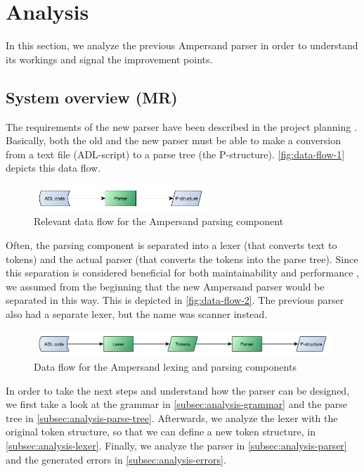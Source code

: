 
\section{Analysis}
\label{sec:analysis}
In this section, we analyze the previous Ampersand parser in order to understand its workings and signal the improvement points.

\subsection{System overview (MR)}
The requirements of the new parser have been described in the project planning .
Basically, both the old and the new parser must be able to make a conversion from a text file (ADL-script) to a parse tree (the P-structure).
\autoref{fig:data-flow-1} depicts this data flow.
%
\begin{figure}[htb!]
	\centering
	\includegraphics[width=0.586\textwidth]{Figures/DataFlow1}
	\caption{Relevant data flow for the Ampersand parsing component}
	\label{fig:data-flow-1}
\end{figure}

Often, the parsing component is separated into a lexer (that converts text to tokens) and the actual parser (that converts the tokens into the parse tree).
Since this separation is considered beneficial for both maintainability and performance , we assumed from the beginning that the new Ampersand parser would be separated in this way.
This is depicted in \autoref{fig:data-flow-2}.
The previous parser also had a separate lexer, but the name was scanner instead.
%
\begin{figure}[htb!]
	\centering
	\includegraphics[width=1\textwidth]{Figures/DataFlow2}
	\caption{Data flow for the Ampersand lexing and parsing components}
	\label{fig:data-flow-2}
\end{figure}

In order to take the next steps and understand how the parser can be designed, we first take a look at the grammar in \autoref{subsec:analysis-grammar} and the parse tree in \autoref{subsec:analysis-parse-tree}.
Afterwards, we analyze the lexer with the original token structure, so that we can define a new token structure, in \autoref{subsec:analysis-lexer}.
Finally, we analyze the parser in \autoref{subsec:analysis-parser} and the generated errors in \autoref{subsec:analysis-errors}.

